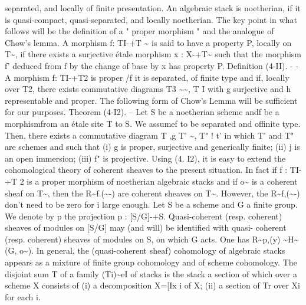 \documentclass[11pt]{article}
\theoremstyle{plain}
\theoremstyle{definition}
\theoremstyle{remark}
\begin{document}
separated, and locally of finite presentation. An algebraic stack is noetherian, if it is quasi-compact, quasi-separated, and locally noetherian. The key point in what follows will be the definition of a " proper morphism " and the analogue of Chow's lemma. A morphism f: TI-+T \textasciitilde{} is said to have a property P, locally on T\textasciitilde{}, if there exists a surjective étale morphism x : X-+T\textasciitilde{} such that the morphism f' deduced from f by the change of base by x has property P. Definition (4-II). - - A morphism f: TI-+T2 is proper /f it is separated, of finite type and if, locally over T2, there exists commutative diagrams T3 \textasciitilde{}\textasciitilde{}, T I with g surjective and h representable and proper. The following form of Chow's Lemma will be sufficient for our purposes. Theorem (4-I2). -- Let S be a noetherian scheme andf be a morphismfrom an étale site T to S. We assumef to be separated and offinite type. Then, there exists a commutative diagram T ,g T' \textasciitilde{}, T" ! t' in which T' and T" are schemes and such that (i) g is proper, surjective and generically finite; (ii) j is an open immersion; (iii) f" is projective. Using (4. I2), it is easy to extend the cohomological theory of coherent sheaves to the present situation. In fact if f : TI-+T 2 is a proper morphism of noetherian algebraic stacks and if o\textasciitilde{} is a coherent sheaf on T\textasciitilde{}, then the R\textasciitilde{}f.(\textasciitilde{}-) are coherent sheaves on T\textasciitilde{}. However, the R\textasciitilde{}f,(\textasciitilde{}-) don't need to be zero for i large enough. Let S be a scheme and G a finite group. We denote by p the projection p : [S/G]-+S. Quasi-coherent (resp. coherent) sheaves of modules on [S/G] may (and will) be identified with quasi- coherent (resp. coherent) sheaves of modules on S, on which G acts. One has R\textasciitilde{}p,(y) \textasciitilde{}H\textasciitilde{}(G, o\textasciitilde{}). In general, the (quasi-coherent sheaf) cohomology of algebraic stacks appears as a mixture of finite group cohomology and of scheme cohomology. The disjoint sum T of a family (Ti)\textasciitilde{}eI of stacks is the stack a section of which over a scheme X consists of (i) a decomposition X=[Ix i of X; (ii) a section of Tr over Xi for each i.
\end{document}
